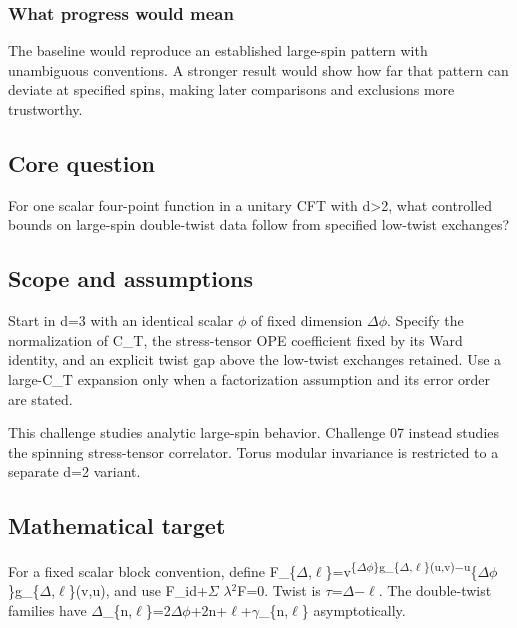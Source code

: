\documentclass[
  11pt,
]{article}
\begin{document}
\subsubsection{What progress would mean}

The baseline would reproduce an established large-spin pattern with
unambiguous conventions. A stronger result would show how far that
pattern can deviate at specified spins, making later comparisons and
exclusions more trustworthy.

\subsection{Core question}

For one scalar four-point function in a unitary CFT with d\textgreater2,
what controlled bounds on large-spin double-twist data follow from
specified low-twist exchanges?

\subsection{Scope and assumptions}

Start in d=3 with an identical scalar \ensuremath{\phi} of fixed
dimension \ensuremath{\Delta}\ensuremath{\phi}. Specify the
normalization of C\_T, the stress-tensor OPE coefficient fixed by its
Ward identity, and an explicit twist gap above the low-twist exchanges
retained. Use a large-C\_T expansion only when a factorization
assumption and its error order are stated.

This challenge studies analytic large-spin behavior. Challenge 07
instead studies the spinning stress-tensor correlator. Torus modular
invariance is restricted to a separate d=2 variant.

\subsection{Mathematical target}

For a fixed scalar block convention, define
F\_\{\ensuremath{\Delta},\ensuremath{\ell}\}=v\textsuperscript{\{\ensuremath{\Delta}\ensuremath{\phi}\}g\_\{\ensuremath{\Delta},\ensuremath{\ell}\}(u,v)\ensuremath{-}u}\{\ensuremath{\Delta}\ensuremath{\phi}\}g\_\{\ensuremath{\Delta},\ensuremath{\ell}\}(v,u),
and use F\_id+\ensuremath{\Sigma}
\ensuremath{\lambda}\ensuremath{{}^{2}}F=0. Twist is
\ensuremath{\tau}=\ensuremath{\Delta}\ensuremath{-}\ensuremath{\ell}.
The double-twist families have
\ensuremath{\Delta}\_\{n,\ensuremath{\ell}\}=2\ensuremath{\Delta}\ensuremath{\phi}+2n+\ensuremath{\ell}+\ensuremath{\gamma}\_\{n,\ensuremath{\ell}\}
asymptotically.
\end{document}
